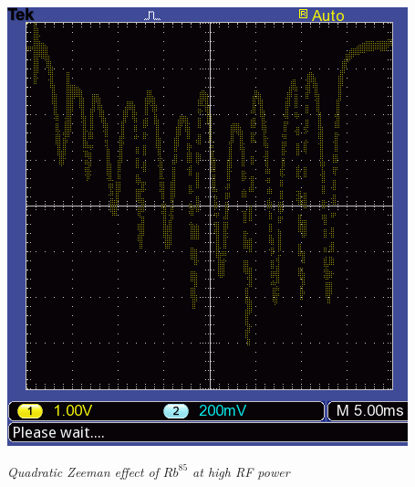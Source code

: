 \documentclass[twocolumn]{article}
\begin{document}
\includegraphics[width=\linewidth]{pictures/rb85-high-raw.png}
\caption{\textit{Quadratic Zeeman effect of $Rb^{85}$ at high RF power \\ }}
\justify
\end{document}
